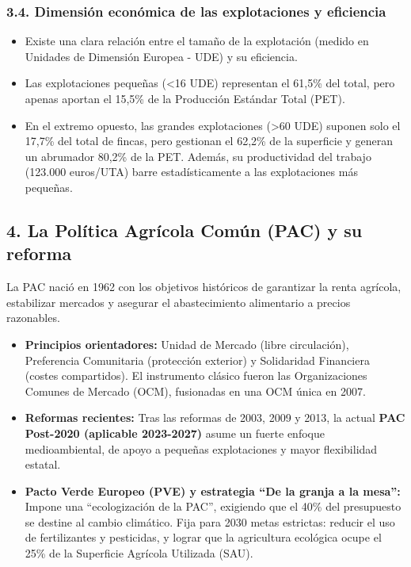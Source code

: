 \subsubsection*{3.4. Dimensión económica de las explotaciones y eficiencia}

\begin{itemize}
  \item Existe una clara relación entre el tamaño de la explotación (medido en Unidades de Dimensión Europea - UDE) y su eficiencia.
  \item Las explotaciones pequeñas (<16 UDE) representan el 61,5\% del total, pero apenas aportan el 15,5\% de la Producción Estándar Total (PET).
  \item En el extremo opuesto, las grandes explotaciones (>60 UDE) suponen solo el 17,7\% del total de fincas, pero gestionan el 62,2\% de la superficie y generan un abrumador 80,2\% de la PET. Además, su productividad del trabajo (123.000 euros/UTA) barre estadísticamente a las explotaciones más pequeñas.
\end{itemize}

\subsection*{4. La Política Agrícola Común (PAC) y su reforma}

La PAC nació en 1962 con los objetivos históricos de garantizar la renta agrícola, estabilizar mercados y asegurar el abastecimiento alimentario a precios razonables.

\begin{itemize}
  \item \textbf{Principios orientadores:} Unidad de Mercado (libre circulación), Preferencia Comunitaria (protección exterior) y Solidaridad Financiera (costes compartidos). El instrumento clásico fueron las Organizaciones Comunes de Mercado (OCM), fusionadas en una OCM única en 2007.
  \item \textbf{Reformas recientes:} Tras las reformas de 2003, 2009 y 2013, la actual \textbf{PAC Post-2020 (aplicable 2023-2027)} asume un fuerte enfoque medioambiental, de apoyo a pequeñas explotaciones y mayor flexibilidad estatal.
  \item \textbf{Pacto Verde Europeo (PVE) y estrategia ``De la granja a la mesa'':} Impone una ``ecologización de la PAC'', exigiendo que el 40\% del presupuesto se destine al cambio climático. Fija para 2030 metas estrictas: reducir el uso de fertilizantes y pesticidas, y lograr que la agricultura ecológica ocupe el 25\% de la Superficie Agrícola Utilizada (SAU).
\end{itemize}

